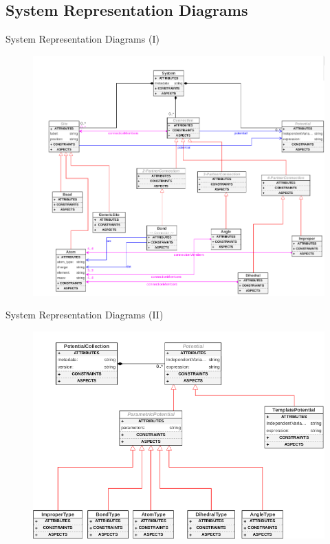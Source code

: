 \documentclass[xcolor=table]{beamer}
\begin{document}
\subsection{System Representation Diagrams}
\begin{frame}[plain]{System Representation Diagrams (I)}

\begin{figure}[]
    \centering
    \includegraphics[scale=0.28]{docs/topo}
    \label{fig:TopoDiagram}
\end{figure}
\end{frame}

\begin{frame}[plain]{System Representation Diagrams (II)}

\begin{figure}[]
    \centering
    \includegraphics[scale=0.28]{docs/pot}
    \label{fig:TopoDiagram}
\end{figure}
\end{frame}
\end{document}
